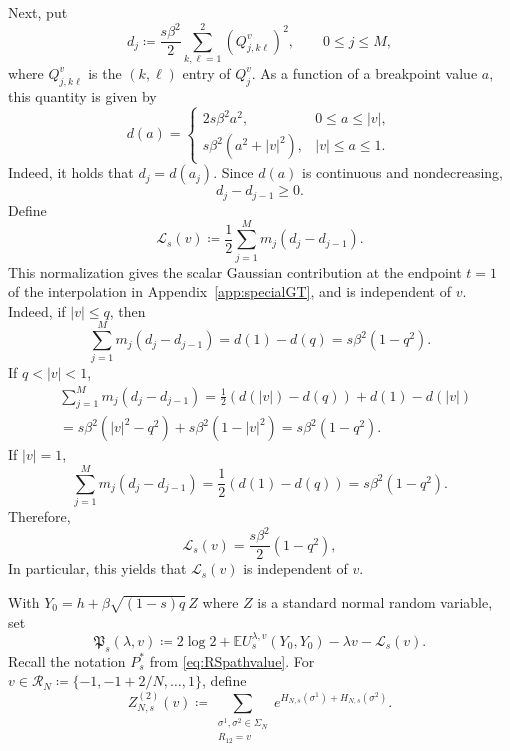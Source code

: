 \documentclass[11pt]{article}
\numberwithin{equation}{section}
\newcommand{\E}{\mathbb{E}}
\newcommand{\R}{\mathbb{R}}
\newcommand{\1}{\mathbf 1}
\begin{document}
Next, put
\begin{equation}\label{eq:defd}
 d_j\coloneqq\frac{s\beta^2}{2}
 \sum_{k,\ell =1}^2(Q_{j,k\ell}^v)^2,
 \qquad 0\le j\le M,
\end{equation}
where $Q_{j,k\ell}^v$ is the $(k,\ell)$ entry of $Q_{j}^v$.
As a function of a breakpoint value $a$, this quantity is given by
\[
 d(a)=
 \begin{cases}
 2s\beta^2a^2,&0\le a\le |v|,\\[1mm]
 s\beta^2(a^2+|v|^2),&|v|\le a\le1.
 \end{cases}
\]
Indeed, it holds that $d_j = d(a_j)$.
Since $d(a)$ is continuous and nondecreasing, 
\begin{equation}\label{eq:finite-step-scalar-increments}
d_j-d_{j-1}\ge0.
\end{equation}
Define
\begin{equation}\label{eq:defLv}
 \mathcal L_s(v)\coloneqq
 \frac12\sum_{j=1}^Mm_j(d_j-d_{j-1}).
\end{equation}
This normalization gives the scalar Gaussian contribution at the
endpoint $t=1$ of the interpolation in Appendix~\ref{app:specialGT}, and is independent of $v$.  Indeed, if $|v|\le q$, then
\[
\sum_{j=1}^Mm_j(d_j-d_{j-1}) = d(1)-d(q)=s\beta^2(1-q^2).
\]
If $q<|v| < 1$,
\begin{align*}
&\sum_{j=1}^Mm_j(d_j-d_{j-1})
 =\frac12(d(|v|)-d(q))+d(1)-d(|v|) \\
& =s\beta^2(|v|^2-q^2)+s\beta^2(1-|v|^2)
 =s\beta^2(1-q^2).
\end{align*}
If $|v|=1$,
\[
 \sum_{j=1}^M m_j(d_j-d_{j-1}) = \frac12(d(1)-d(q))=s\beta^2(1-q^2).
\]
Therefore,
\begin{equation}
 \mathcal L_s(v)=\frac{s\beta^2}{2}(1-q^2),
 \label{eq:GTcorrection}
\end{equation}
In particular, this yields that $\mathcal L_s(v)$ is independent of $v$.

With $Y_0=h+\beta\sqrt{(1-s)q}\,Z$ where $Z$ is a standard normal random variable, set
\begin{equation}
 \mathfrak P_s(\lambda,v)
 \coloneqq2\log2+\E U_s^{\lambda,v}(Y_0,Y_0)
 -\lambda v-\mathcal L_s(v).
 \label{eq:GTfunctional}
\end{equation}
Recall the notation $P_s^*$ from \eqref{eq:RSpathvalue}. For  $v\in\mathcal R_N
\coloneqq\{-1,-1+2/N,\ldots,1\}$, define
\begin{equation}
 Z^{(2)}_{N,s}(v)
 \coloneqq
 \sum_{\substack{\sigma^1,\sigma^2\in\Sigma_N\\R_{12}=v}}
 e^{H_{N,s}(\sigma^1)+H_{N,s}(\sigma^2)}.
 \label{eq:constrainedZ}
\end{equation}
\end{document}
